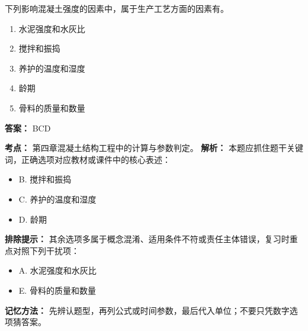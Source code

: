 \documentclass[UTF8,fontset=fandol,11pt]{ctexart}
\begin{document}
\begin{quizbox}[title={第 62 题}]
下列影响混凝土强度的因素中，属于生产工艺方面的因素有。\\
\begin{enumerate}[label=\Alph*.]
\item 水泥强度和水灰比
\item 搅拌和振捣
\item 养护的温度和湿度
\item 龄期
\item 骨料的质量和数量
\end{enumerate}
\textbf{答案：} BCD
\vspace{0.25em}
\begin{answerbox}[title={考点解析}]
\textbf{考点：} 第四章混凝土结构工程中的计算与参数判定。
\textbf{解析：} 本题应抓住题干关键词，正确选项对应教材或课件中的核心表述：
\begin{itemize}
\item B. 搅拌和振捣
\item C. 养护的温度和湿度
\item D. 龄期
\end{itemize}
\textbf{排除提示：} 其余选项多属于概念混淆、适用条件不符或责任主体错误，复习时重点对照下列干扰项：
\begin{itemize}
\item A. 水泥强度和水灰比
\item E. 骨料的质量和数量
\end{itemize}
\textbf{记忆方法：} 先辨认题型，再列公式或时间参数，最后代入单位；不要只凭数字选项猜答案。
\end{answerbox}
\end{quizbox}

\vspace{0.2em}
\end{document}
